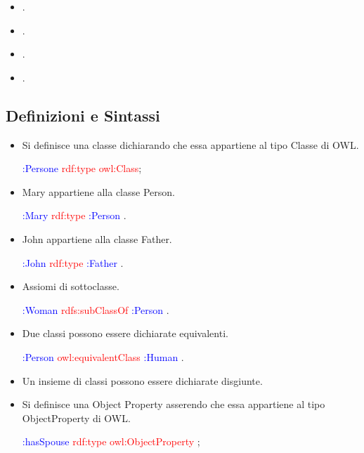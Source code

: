 \begin{itemize}
  \item {}. 
  \item {}.
  \item {}. 
  \item {}.
\end{itemize}

\subsection{Definizioni e Sintassi}

\begin{itemize}
  \item Si definisce una classe dichiarando che essa
appartiene al tipo Classe di OWL. 
\begin{center}
  \textcolor{blue}{:Persone} \textcolor{red}{rdf:type owl:Class};
\end{center}
\item Mary appartiene alla classe Person. 
  \begin{center}
    \textcolor{blue}{:Mary} \textcolor{red}{rdf:type} \textcolor{blue}{:Person} .
  \end{center}
\item John appartiene alla classe Father. 
  \begin{center}
    \textcolor{blue}{:John} \textcolor{red}{rdf:type} \textcolor{blue}{:Father} .
  \end{center}
\item Assiomi di sottoclasse. 
  \begin{center}
    \textcolor{blue}{:Woman} \textcolor{red}{rdfs:subClassOf} \textcolor{blue}{:Person} .
  \end{center}
\item Due classi possono essere dichiarate equivalenti. 
  \begin{center}
    \textcolor{blue}{:Person} \textcolor{red}{owl:equivalentClass} \textcolor{blue}{:Human} .
  \end{center}
\item Un insieme di classi possono essere dichiarate
disgiunte. 
\item Si definisce una Object Property asserendo
che essa appartiene al tipo ObjectProperty di
OWL. 
\begin{center}
  \textcolor{blue}{:hasSpouse} \textcolor{red}{rdf:type owl:ObjectProperty} ;

\end{center}
\end{itemize}
